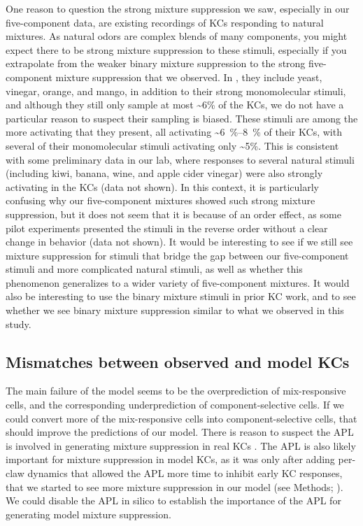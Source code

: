 \documentclass[12pt]{caltech_thesis}
\renewcommand{\cite}{{ }\autocite}
\let\Oldsubsection\subsection
\renewcommand{\subsection}{\FloatBarrier\Oldsubsection}
\begin{document}
\begin{refsection}
One reason to question the strong mixture suppression we saw, especially in our five-component data, are existing recordings of KCs responding to natural mixtures.
As natural odors are complex blends of many components, you might expect there to be strong mixture suppression to these stimuli, especially if you extrapolate from the weaker binary mixture suppression to the strong five-component mixture suppression that we observed.
In \textcite{Honegger2011}, they include yeast, vinegar, orange, and mango, in addition to their strong monomolecular stimuli, and although they still only sample at most \textasciitilde6\% of the KCs, we do not have a particular reason to suspect their sampling is biased.
These stimuli are among the more activating that they present, all activating \textasciitilde\qtyrange{6}{8}{\percent} of their KCs, with several of their monomolecular stimuli activating only \textasciitilde5\%.
This is consistent with some preliminary data in our lab, where responses to several natural stimuli (including kiwi, banana, wine, and apple cider vinegar) were also strongly activating in the KCs (data not shown).
In this context, it is particularly confusing why our five-component mixtures showed such strong mixture suppression, but it does not seem that it is because of an order effect, as some pilot experiments presented the stimuli in the reverse order without a clear change in behavior (data not shown).
It would be interesting to see if we still see mixture suppression for stimuli that bridge the gap between our five-component stimuli and more complicated natural stimuli, as well as whether this phenomenon generalizes to a wider variety of five-component mixtures.
It would also be interesting to use the binary mixture stimuli in prior KC work, and to see whether we see binary mixture suppression similar to what we observed in this study.


\subsection{Mismatches between observed and model KCs}
The main failure of the model seems to be the overprediction of mix-responsive cells, and the corresponding underprediction of component-selective cells.
If we could convert more of the mix-responsive cells into component-selective cells, that should improve the predictions of our model.
There is reason to suspect the APL is involved in generating mixture suppression in real KCs\cite{Lin2014}.
The APL is also likely important for mixture suppression in model KCs, as it was only after adding per-claw dynamics that allowed the APL more time to inhibit early KC responses, that we started to see more mixture suppression in our model (see Methods; ).
We could disable the APL in silico to establish the importance of the APL for generating model mixture suppression.


\end{refsection}
\end{document}
